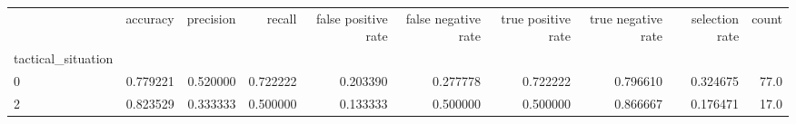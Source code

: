 \begin{tabular}{lrrrrrrrrr}
\toprule
{} &  accuracy &  precision &    recall &  false positive rate &  false negative rate &  true positive rate &  true negative rate &  selection rate &  count \\
tactical\_situation &           &            &           &                      &                      &                     &                     &                 &        \\
\midrule
0                  &  0.779221 &   0.520000 &  0.722222 &             0.203390 &             0.277778 &            0.722222 &            0.796610 &        0.324675 &   77.0 \\
2                  &  0.823529 &   0.333333 &  0.500000 &             0.133333 &             0.500000 &            0.500000 &            0.866667 &        0.176471 &   17.0 \\
\bottomrule
\end{tabular}
